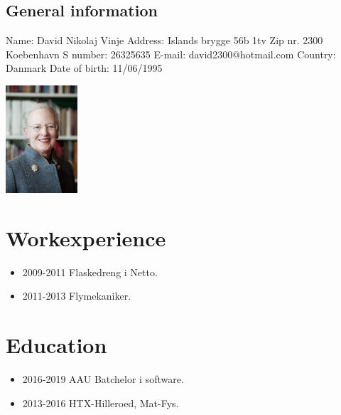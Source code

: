 \begin{center}
 \begin{minipage}[b]{0.45\textwidth} 
\subsection*{General information}
Name: David Nikolaj Vinje 
Address: Islands brygge 56b 1tv
Zip nr. 2300 Koebenhavn S
number: 26325635
E-mail: david2300@hotmail.com
Country: Danmark
Date of birth: 11/06/1995

 \end{minipage}
 \hfill
\begin{minipage}[b]{3cm}
 \includegraphics[height=4cm]{figures/1200px-Drottning_Margrethe_av_Danmark}
 \end{minipage}
 \end{center}

\section*{Workexperience}
\begin{itemize}
\item 2009-2011 Flaskedreng i Netto.
\item 2011-2013 Flymekaniker.
\end{itemize}
\section*{Education}
\begin{itemize}
\item 2016-2019 AAU Batchelor i software.
\item 2013-2016 HTX-Hilleroed, Mat-Fys.
\end{itemize}

